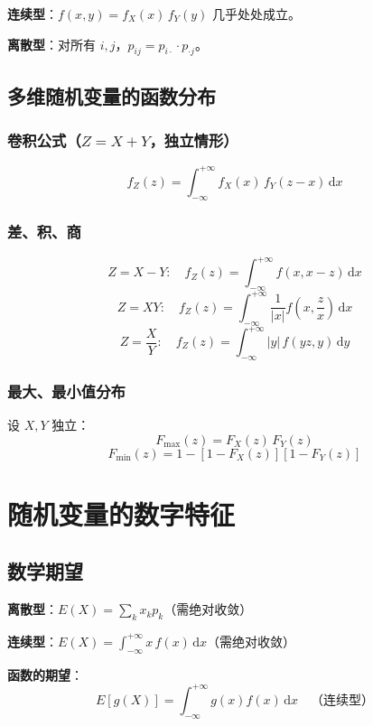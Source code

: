 \documentclass[12pt, a4paper]{article}
\newcommand{\dif}{\,\mathrm{d}}
\begin{document}
\begin{tcolorbox}[thmbox, title={独立性判断}]
    \textbf{连续型}：$f(x,y)=f_X(x)\,f_Y(y)$ 几乎处处成立。

    \textbf{离散型}：对所有 $i,j$，$p_{ij}=p_{i\cdot}\cdot p_{\cdot j}$。
\end{tcolorbox}

\subsection{多维随机变量的函数分布}

\subsubsection{卷积公式（$Z=X+Y$，独立情形）}

\[
    f_Z(z)=\int_{-\infty}^{+\infty}f_X(x)\,f_Y(z-x)\dif x
\]

\subsubsection{差、积、商}

\[
    Z=X-Y:\quad f_Z(z)=\int_{-\infty}^{+\infty}f(x,x-z)\dif x
\]
\[
    Z=XY:\quad f_Z(z)=\int_{-\infty}^{+\infty}\frac{1}{|x|}f\!\left(x,\frac{z}{x}\right)\dif x
\]
\[
    Z=\frac{X}{Y}:\quad f_Z(z)=\int_{-\infty}^{+\infty}|y|\,f(yz,y)\dif y
\]

\subsubsection{最大、最小值分布}

设 $X,Y$ 独立：
\[
    F_{\max}(z)=F_X(z)\,F_Y(z)
\]
\[
    F_{\min}(z)=1-[1-F_X(z)][1-F_Y(z)]
\]

\section{随机变量的数字特征}

\subsection{数学期望}

\begin{tcolorbox}[defbox, title={数学期望}]
    \textbf{离散型}：$E(X)=\displaystyle\sum_{k}x_k p_k$（需绝对收敛）

    \textbf{连续型}：$E(X)=\displaystyle\int_{-\infty}^{+\infty}x\,f(x)\dif x$（需绝对收敛）

    \textbf{函数的期望}：
    \[
        E[g(X)] = \int_{-\infty}^{+\infty}g(x)f(x)\dif x
        \quad\text{（连续型）}
    \]
\end{tcolorbox}
\end{document}
